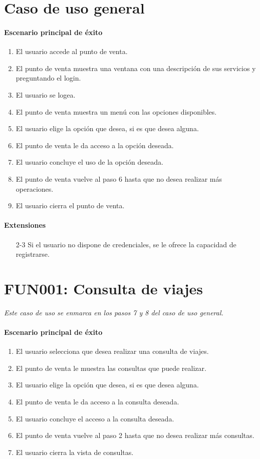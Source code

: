 \section{Caso de uso general}
  \paragraph{Escenario principal de éxito}
  \begin{enumerate}
    \item El usuario accede al punto de venta.
    \item El punto de venta muestra una ventana con una descripción de sus servicios y preguntando el login.
    \item El usuario se logea.
    \item El punto de venta muestra un menú con las opciones disponibles.
    \item El usuario elige la opción que desea, si es que desea alguna.
    \item El punto de venta le da acceso a la opción deseada.
    \item El usuario concluye el uso de la opción deseada.
    \item El punto de venta vuelve al paso 6 hasta que no desea realizar más operaciones.
    \item El usuario cierra el punto de venta.
  \end{enumerate}
  
  \paragraph{Extensiones}
  \begin{enumerate}
    \item[2-3] Si el usuario no dispone de credenciales, se le ofrece la capacidad de registrarse.
  \end{enumerate}

\section{FUN001: Consulta de viajes}
  \emph{Este caso de uso se enmarca en los pasos 7 y 8 del caso de uso general.}
  \paragraph{Escenario principal de éxito}
  \begin{enumerate}
    \item El usuario selecciona que desea realizar una consulta de viajes.
    \item El punto de venta le muestra las consultas que puede realizar.
    \item El usuario elige la opción que desea, si es que desea alguna.
    \item El punto de venta le da acceso a la consulta deseada.
    \item El usuario concluye el acceso a la consulta deseada.
    \item El punto de venta vuelve al paso 2 hasta que no desea realizar más consultas.
    \item El usuario cierra la vista de consultas.
  \end{enumerate}

